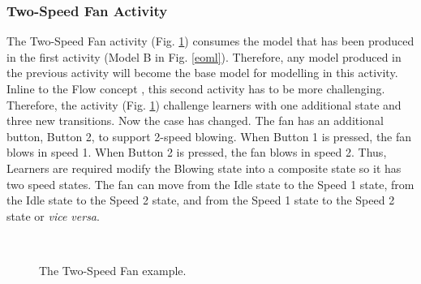 \documentclass[conference]{IEEEtran}
\begin{document}
\subsubsection{Two-Speed Fan Activity}
The Two-Speed Fan activity (Fig. \ref{example-02}) consumes the model that has been produced in the first activity (Model B in Fig. \ref{eoml}). Therefore, any model produced in the previous activity will become the base model for modelling in this activity. Inline to the Flow concept \cite{csikszentmihalyi2014toward}, this second activity has to be more challenging. Therefore, the activity (Fig. \ref{example-02}) challenge learners with one additional state and three new transitions. Now the case has changed. The fan has an additional button, Button 2, to support 2-speed blowing. When Button 1 is pressed, the fan blows in speed 1. When Button 2 is pressed, the fan blows in speed 2. Thus, Learners are required modify the Blowing state into a composite state so it has two speed states. The fan can move from the Idle state to the Speed 1 state, from the Idle state to the Speed 2 state, and from the Speed 1 state to the Speed 2 state or \textit{vice versa}.

\begin{figure}[th]
    \centering
    \\
	\caption{The Two-Speed Fan example.}
    \label{example-02}
\end{figure}
\end{document}
